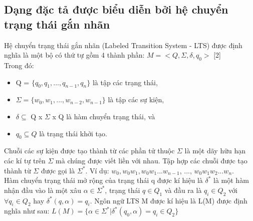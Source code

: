 \documentclass{article}
\begin{document}
\begin{flushleft}
			\subsection{Dạng đặc tả được biểu diễn bởi hệ chuyển trạng thái gắn nhãn}
				Hệ chuyển trạng thái gắn nhãn (Labeled Transition System - LTS) được định nghĩa là một bộ có thứ tự gồm 4 thành phần: $M = <Q, \Sigma, \delta, q_{0}>$ [2]\\
				Trong đó:\\
				\begin{itemize}
					\item Q = $\{q_{0}, q_{1}, ..., q_{n-1}, q_{n}\}$ là tập các trạng thái,
					\item $\Sigma = \{w_{0}, w_{1}, ..., w_{n-2}, w_{n-1}\}$ là tập các sự kiện,
					\item $\delta \subseteq$ Q x $\Sigma$ x Q là hàm chuyển trạng thái, và
					\item $q_{0} \subseteq Q$ là trạng thái khởi tạo.\\
				\end{itemize}
				Chuỗi các sự kiện được tạo thành từ các phần tử thuộc $\Sigma$ là một dãy hữu hạn các kí tự trên $\Sigma$ mà chúng được viết liền với nhau.
				Tập hợp các chuỗi được tạo thành từ $\Sigma$ được gọi là $\Sigma^*$. Ví dụ: $w_{0}, w_{0}w_{1}, w_{0}w_{1}...w_{n-1}$, ..., $w_{0}w_{1}w_{2}...w_{n}$.\\
				Hàm chuyển trạng thái mở rộng của trạng thái q được kí hiệu là $\delta^*$ là một hàm nhận đầu vào là một xâu $\alpha \in \Sigma^*$, trạng thái $q \in Q_{1}$ và đầu ra là $q_{i} \in Q_2$ với $\forall q_{i} \in Q_{2}$ hay $\delta^*(q, \alpha) = q_{i}$.
				Ngôn ngữ LTS M được kí hiệu là L(M) được định nghĩa như sau:
				$L(M) = \{\alpha \in \Sigma^* | \delta^*(q_{0}, \alpha) = q_i \in Q_{2}\}$\\


\end{flushleft}
\end{document}
